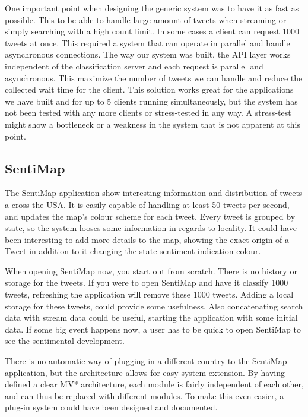 One important point when designing the generic system was to have it as fast as possible. This to be able to handle large amount of tweets when streaming or simply searching with a high count limit. In some cases a client can request 1000 tweets at once. This required a system that can operate in parallel and handle asynchronous connections. The way our system was built, the API layer works independent of the classification server and each request is parallel and asynchronous. This maximize the number of tweets we can handle and reduce the collected wait time for the client. This solution works great for the applications we have built and for up to 5 clients running simultaneously, but the system has not been tested with any more clients or stress-tested in any way. A stress-test might show a bottleneck or a weakness in the system that is not apparent at this point. 

\subsection{SentiMap}

The SentiMap application show interesting information and distribution of tweets a cross the USA. It is easily capable of handling at least 50 tweets per second, and updates the map's colour scheme for each tweet. Every tweet is grouped by state, so the system looses some information in regards to locality. It could have been interesting to add more details to the map, showing the exact origin of a Tweet in addition to it changing the state sentiment indication colour.

When opening SentiMap now, you start out from scratch. There is no history or storage for the tweets. If you were to open SentiMap and have it classify 1000 tweets, refreshing the application will remove these 1000 tweets. Adding a local storage for these tweets, could provide some usefulness. Also concatenating search data with stream data could be useful, starting the application with some initial data. If some big event happens now, a user has to be quick to open SentiMap to see the sentimental development. 

There is no automatic way of plugging in a different country to the SentiMap application, but the architecture allows for easy system extension. By having defined a clear MV* architecture, each module is fairly independent of each other, and can thus be replaced with different modules. To make this even easier, a plug-in system could have been designed and documented. 

